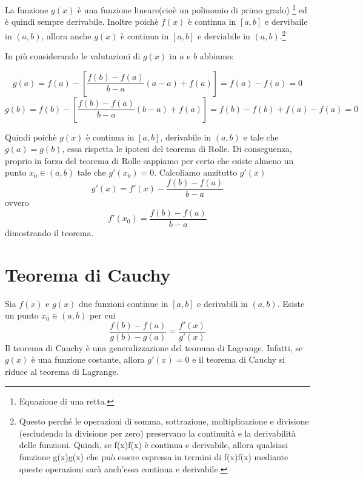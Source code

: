 \documentclass{article}
\begin{document}
La funzione $g(x)$ è una funzione lineare(cioè un polinomio di primo grado) \footnote{Equazione di una retta.} ed è quindi sempre derivabile.
Inoltre poichè $f(x)$ è continua in $[a,b]$ e dervibaile in $(a,b)$, allora anche $g(x)$ è continua in $[a,b]$ e derviabile in $(a,b)$.\footnote{Questo perché le operazioni di somma, sottrazione, moltiplicazione e divisione (escludendo la divisione per zero) preservano la continuità e la derivabilità delle funzioni. Quindi, se f(x)f(x) è continua e derivabile, allora qualsiasi funzione g(x)g(x) che può essere espressa in termini di f(x)f(x) mediante queste operazioni sarà anch'essa continua e derivabile.}

In più considerando le valutazioni di $g(x)$ in $a$ e $b$ abbiamo:

$$g(a)=f(a)-\left[\dfrac{f(b)-f(a)}{b-a} (a-a)+f(a)\right]= f(a)-f(a) = 0$$
$$g(b)=f(b)-\left[\dfrac{f(b)-f(a)}{b-a} (b-a)+f(a) \right]=f(b)-f(b)+f(a)-f(a)=0$$

Quindi poichè $g(x)$ è continua in $[a,b]$, derivabile in $(a,b)$ e tale che $g(a)=g(b)$, essa rispetta le ipotesi del teorema di Rolle.
Di conseguenza, proprio in forza del teorema di Rolle sappiamo per certo che esiste almeno un punto $x_0 \in (a,b)$ tale che $g'(x_0)=0$.
Calcoliamo anzitutto $g'(x)$
$$g'(x)=f'(x)- \dfrac{f(b)-f(a)}{b-a}$$ ovvero
$$f'(x_0) =\dfrac{f(b)-f(a)}{b-a}$$ dimostrando il teorema.
\section{Teorema di Cauchy}
Sia $f(x)$ e $g(x)$ due funzioni continue in $[a,b]$ e derivabili in $(a,b)$. Esiste un punto $x_0 \in (a,b)$ per cui
$$\frac{f(b)- f(a)}{g(b)- g(a)} = \frac{f'(x)}{g'(x)}$$
Il teorema di Cauchy è una generalizzazione del teorema di Lagrange. Infatti, se $g(x)$ è una funzione costante, allora $g'(x)=0$ e il teorema di Cauchy si riduce al teorema di Lagrange.
\end{document}
